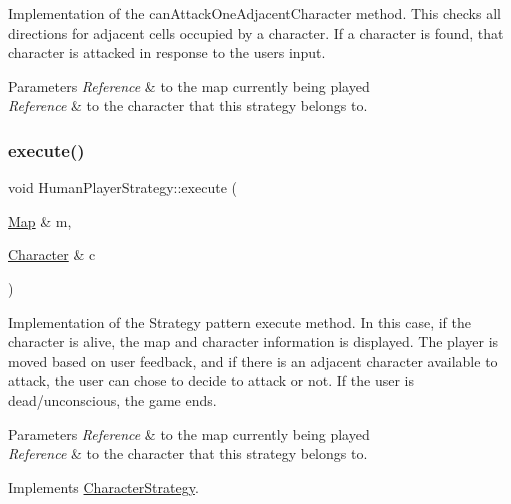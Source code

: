 Implementation of the can\+Attack\+One\+Adjacent\+Character method. This checks all directions for adjacent cells occupied by a character. If a character is found, that character is attacked in response to the user\textquotesingle{}s input. 
\begin{DoxyParams}{Parameters}
{\em Reference} & to the map currently being played \\
\hline
{\em Reference} & to the character that this strategy belongs to. \\
\hline
\end{DoxyParams}
\hypertarget{class_human_player_strategy_a6bd8ba3a590ee457282f57074d66809d}{}\label{class_human_player_strategy_a6bd8ba3a590ee457282f57074d66809d} 
\subsubsection{\texorpdfstring{execute()}{execute()}}
{\footnotesize\ttfamily void Human\+Player\+Strategy\+::execute (\begin{DoxyParamCaption}\item[{\hyperlink{class_map}{Map} \&}]{m,  }\item[{\hyperlink{class_character}{Character} \&}]{c }\end{DoxyParamCaption})\hspace{0.3cm}{\ttfamily [virtual]}}

Implementation of the Strategy pattern execute method. In this case, if the character is alive, the map and character information is displayed. The player is moved based on user feedback, and if there is an adjacent character available to attack, the user can chose to decide to attack or not. If the user is dead/unconscious, the game ends. 
\begin{DoxyParams}{Parameters}
{\em Reference} & to the map currently being played \\
\hline
{\em Reference} & to the character that this strategy belongs to. \\
\hline
\end{DoxyParams}


Implements \hyperlink{class_character_strategy}{Character\+Strategy}.

\hypertarget{class_human_player_strategy_a2697fde934ee29e34a03191b7002726b}{}\label{class_human_player_strategy_a2697fde934ee29e34a03191b7002726b} 
